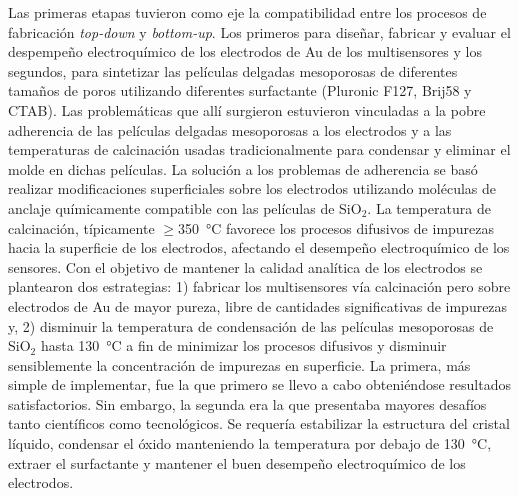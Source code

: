  Las primeras etapas tuvieron como eje la compatibilidad entre los procesos de fabricación \textit{top-down} y \textit{bottom-up}. Los primeros para diseñar, fabricar y evaluar el despempeño electroquímico de los electrodos de Au de los multisensores y los segundos, para sintetizar las películas delgadas mesoporosas de diferentes tamaños de poros utilizando diferentes surfactante (Pluronic F127, Brij58 y CTAB). Las problemáticas que allí surgieron estuvieron vinculadas a la pobre adherencia de las películas delgadas mesoporosas a los electrodos y a las temperaturas de calcinación usadas tradicionalmente para condensar y eliminar el molde en dichas películas. La solución a los problemas de adherencia se basó realizar modificaciones superficiales sobre los electrodos utilizando moléculas de anclaje químicamente compatible con las películas de SiO$_2$. La temperatura de calcinación, típicamente $\geq$\SI{350}{\celsius} favorece los procesos difusivos de impurezas hacia la superficie de los electrodos, afectando el desempeño electroquímico de los sensores. Con el objetivo de mantener la calidad analítica de los electrodos se plantearon dos estrategias: 1) fabricar los multisensores vía calcinación pero sobre electrodos de Au de mayor pureza, libre de cantidades significativas de impurezas y, 2) disminuir la temperatura de condensación de las películas mesoporosas de SiO$_2$ hasta \SI{130}{\celsius} a fin de minimizar los procesos difusivos y disminuir sensiblemente la concentración de impurezas en superficie. La primera, más simple de implementar, fue la que primero se llevo a cabo obteniéndose resultados satisfactorios. Sin embargo, la segunda era la que presentaba mayores desafíos tanto científicos como tecnológicos. Se requería estabilizar la estructura del cristal líquido, condensar el óxido manteniendo la temperatura por debajo de \SI{130}{\celsius}, extraer el surfactante y mantener el buen desempeño electroquímico de los electrodos.  

